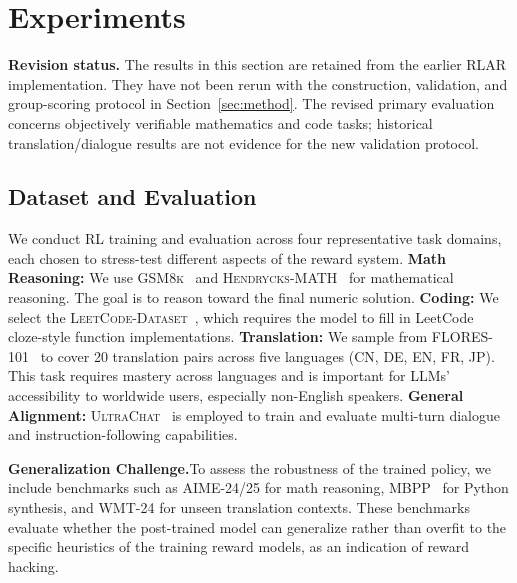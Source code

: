 
\section{Experiments}

\noindent\textbf{Revision status.} The results in this section are retained from the earlier RLAR implementation. They have not been rerun with the construction, validation, and group-scoring protocol in Section~\ref{sec:method}. The revised primary evaluation concerns objectively verifiable mathematics and code tasks; historical translation/dialogue results are not evidence for the new validation protocol.



\subsection{Dataset and Evaluation}

We conduct RL training and evaluation across four representative task domains, each chosen to stress-test different aspects of the reward system. \textbf{Math Reasoning:} We use \textsc{GSM8k}~\citep{gsm8k} and \textsc{Hendrycks-MATH}~\citep{hendrycks2021measuringmathematicalproblemsolving} for mathematical reasoning. The goal is to reason toward the final numeric solution. \textbf{Coding:} We select the \textsc{LeetCode-Dataset}~\citep{leetcodedataset}, which requires the model to fill in LeetCode cloze-style function implementations. \textbf{Translation:} We sample from \textsc{FLORES-101}~\citep{flores101} to cover 20 translation pairs across five languages (CN, DE, EN, FR, JP). This task requires mastery across languages and is important for LLMs' accessibility to worldwide users, especially non-English speakers. \textbf{General Alignment:} \textsc{UltraChat}~\citep{ultrachat} is employed to train and evaluate multi-turn dialogue and instruction-following capabilities.


\noindent\textbf{Generalization Challenge.}\quad To assess the robustness of the trained policy, we include benchmarks such as \textsc{AIME-24/25} for math reasoning, \textsc{MBPP}~\citep{mbpp} for Python synthesis, and \textsc{WMT-24} for unseen translation contexts. 
These benchmarks evaluate whether the post-trained model can generalize rather than overfit to the specific heuristics of the training reward models, as an indication of reward hacking.



